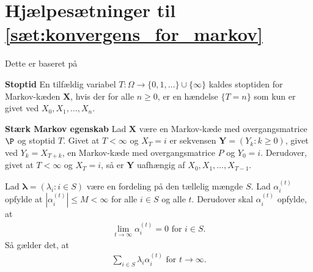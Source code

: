 \section{Hjælpesætninger til \autoref{sæt:konvergens_for_markov}}\label{hjælpesæt}

Dette er baseret på \cite[s. 225 og 234]{oxford}

\begin{minipage}\textwidth
\begin{defn}\label{stoptid}\textbf{Stoptid} %
\newline
En tilfældig variabel $T: \Omega \to \{0,1,\ldots\}\cup \{\infty\}$ kaldes stoptiden for Markov-kæden $\bm X$, hvis der for alle $n\geq 0$, er en hændelse $\{T = n\}$ som kun er givet ved $X_0,X_1, \ldots, X_n$.
\end{defn}
\end{minipage}

\begin{minipage}\textwidth
\begin{thmx} \label{stærk_markov}\textbf{Stærk Markov egenskab} %
\newline
Lad $\bm X$ være en Markov-kæde med overgangsmatrice $\P$ og stoptid $T$. Givet at $T < \infty$ og $X_T = i$ er sekvensen $\bm Y = (Y_k: k \geq 0)$, givet ved $Y_k = X_{T+k}$, en Markov-kæde med overgangsmatrice $P$ og $Y_0=i$. Derudover, givet at $T < \infty$ og $X_T = i$, så er $\bm Y$ uafhængig af $X_0, X_1, \ldots, X_{T-1}$.
\end{thmx}
\end{minipage}

\begin{minipage}\textwidth
\begin{lem} \label{sidstelemma}\textbf{} %
\newline
Lad $\bm \lambda = (\lambda_i : i \in S)$ være en fordeling på den tællelig mængde $S$. Lad $\alpha_i^{(t)}$ opfylde at $|\alpha_i^{(t)}| \leq M < \infty$ for alle $i \in S$ og alle $t$. Derudover skal $\alpha_i^{(t)}$ opfylde, at
\begin{align*}
    \lim_{t\to\infty} \alpha_i^{(t)}=0 \text{ for } i\in S.
\end{align*}
Så gælder det, at
\begin{align*}
    \sum_{i\in S}\lambda_i\alpha_i^{(t)} \text{ for } t\to\infty.
\end{align*}
\end{lem}
\end{minipage}
